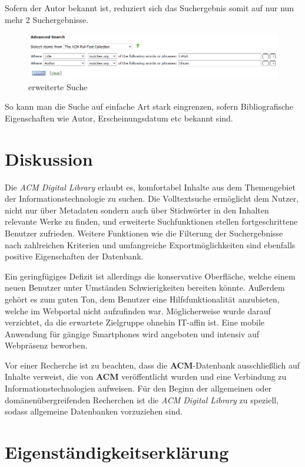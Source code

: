 \documentclass[
	ngerman,
	parskip=half,
	headsepline,
	fontsize=12pt,
	DIV=13,
	listof=leveldown,
	]{scrreprt}
\begin{document}
Sofern der Autor bekannt ist, reduziert sich das Suchergebnis somit auf nur nun mehr 2 Suchergebnisse.
\begin{figure}[ht]
\centering
\includegraphics[width=\textwidth]{img/Suche_FPGA-Shum.PNG}
\caption{erweiterte Suche}
\end{figure}
So kann man die Suche auf einfache Art stark eingrenzen, sofern Bibliografische Eigenschaften wie Autor, Erscheinungsdatum etc bekannt sind.
	
	\chapter{Diskussion}	
	
	Die \textsl{ACM Digital Library} erlaubt es, komfortabel Inhalte aus dem Themengebiet der Informationstechnologie zu suchen. Die Volltextsuche ermöglicht dem Nutzer, nicht nur über Metadaten sondern auch über Stichwörter in den Inhalten relevante Werke zu finden, und erweiterte Suchfunktionen stellen fortgeschrittene Benutzer zufrieden. Weitere Funktionen wie die Filterung der Suchergebnisse nach zahlreichen Kriterien und umfangreiche Exportmöglichkeiten sind ebenfalls positive Eigenschaften der Datenbank. 
	
	Ein geringfügiges Defizit ist allerdings die konservative Oberfläche, welche einem neuen Benutzer unter Umständen Schwierigkeiten bereiten könnte. Außerdem gehört es zum guten Ton, dem Benutzer eine Hilfsfunktionalität anzubieten, welche im Webportal nicht aufzufinden war. Möglicherweise wurde darauf verzichtet, da die erwartete Zielgruppe ohnehin IT-affin ist.
	Eine mobile Anwendung für gängige Smartphones wird angeboten und intensiv auf Webpräsenz beworben.	
	
	Vor einer Recherche ist zu beachten, dass die \textbf{ACM}-Datenbank ausschließlich auf Inhalte verweist, die von \textbf{ACM} veröffentlicht wurden und  eine Verbindung zu Informationstechnologien aufweisen. Für den Beginn der allgemeinen oder domänenübergreifenden Recherchen ist die \textsl{ACM Digital Library} zu speziell, sodass allgemeine Datenbanken vorzuziehen sind.
	
	\chapter{Eigenständigkeitserklärung}
	
\end{document}
